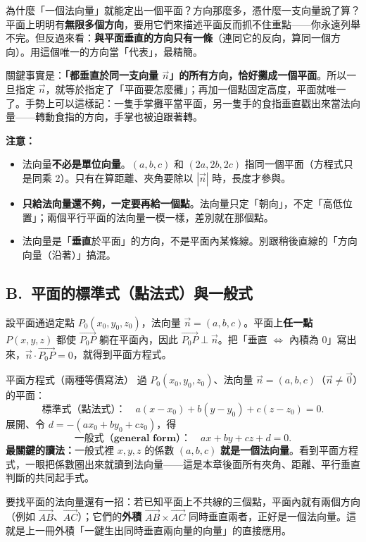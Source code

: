 \documentclass[11pt]{article}
\begin{document}
\begin{補充框}{為什麼「一個法向量」就能定出一個平面？方向那麼多，憑什麼一支向量說了算？}
平面上明明有\textbf{無限多個方向}，要用它們來描述平面反而抓不住重點——你永遠列舉不完。但反過來看：\textbf{與平面垂直的方向只有一條}（連同它的反向，算同一個方向）。用這個唯一的方向當「代表」，最精簡。

關鍵事實是：\textbf{「都垂直於同一支向量 $\vec n$」的所有方向，恰好攤成一個平面}。所以一旦指定 $\vec n$，就等於指定了「平面要怎麼攤」；再加一個點固定高度，平面就唯一了。手勢上可以這樣記：一隻手掌攤平當平面，另一隻手的食指垂直戳出來當法向量——轉動食指的方向，手掌也被迫跟著轉。

\textbf{注意：}
\begin{itemize}\setlength{\itemsep}{1pt}
\item 法向量\textbf{不必是單位向量}。$(a,b,c)$ 和 $(2a,2b,2c)$ 指同一個平面（方程式只是同乘 2）。只有在算距離、夾角要除以 $|\vec n|$ 時，長度才參與。
\item \textbf{只給法向量還不夠，一定要再給一個點}。法向量只定「朝向」，不定「高低位置」；兩個平行平面的法向量一模一樣，差別就在那個點。
\item 法向量是「\textbf{垂直}於平面」的方向，不是平面內某條線。別跟稍後直線的「方向向量（沿著）」搞混。
\end{itemize}
\end{補充框}

\subsection*{\sffamily B.\ 平面的標準式（點法式）與一般式}

設平面通過定點 $P_0(x_0,y_0,z_0)$，法向量 $\vec n=(a,b,c)$。平面上\textbf{任一點} $P(x,y,z)$ 都使 $\vec{P_0P}$ 躺在平面內，因此 $\vec{P_0P}\perp\vec n$。把「垂直 $\iff$ 內積為 0」寫出來，$\vec n\cdot\vec{P_0P}=0$，就得到平面方程式。

\begin{補充框}{平面方程式（兩種等價寫法）}
過 $P_0(x_0,y_0,z_0)$、法向量 $\vec n=(a,b,c)$（$\vec n\ne\vec0$）的平面：
$$\textbf{標準式（點法式）：}\quad a(x-x_0)+b(y-y_0)+c(z-z_0)=0.$$
展開、令 $d=-(ax_0+by_0+cz_0)$，得
$$\textbf{一般式（general form）：}\quad ax+by+cz+d=0.$$
\textbf{最關鍵的讀法：}一般式裡 $x,y,z$ 的係數 $(a,b,c)$ \textbf{就是一個法向量}。看到平面方程式，一眼把係數圈出來就讀到法向量——這是本章後面所有夾角、距離、平行垂直判斷的共同起手式。
\end{補充框}

要找平面的法向量還有一招：若已知平面上不共線的三個點，平面內就有兩個方向（例如 $\vec{AB}$、$\vec{AC}$）；它們的\textbf{外積} $\vec{AB}\times\vec{AC}$ 同時垂直兩者，正好是一個法向量。這就是上一冊外積「一鍵生出同時垂直兩向量的向量」的直接應用。
\end{document}
